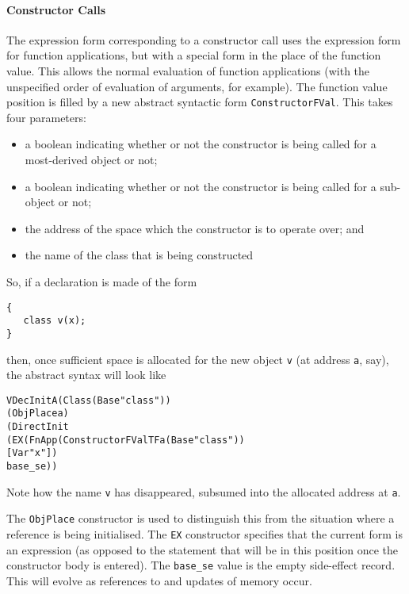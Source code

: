 \documentclass[11pt]{article}
\begin{document}
\paragraph{Constructor Calls}
The expression form corresponding to a constructor call uses the
expression form for function applications, but with a special form in
the place of the function value.  This allows the normal evaluation of
function applications (with the unspecified order of evaluation of
arguments, for example).  The function value position is filled by a
new abstract syntactic form
\texttt{ConstructorFVal}.
This takes four parameters:
\begin{itemize}
\item a boolean indicating whether or not the constructor is being
  called for a most-derived object or not;
\item a boolean indicating whether or not the constructor is being
  called for a sub-object or not;
\item the address of the space which the constructor is to operate
  over; and
\item the name of the class that is being constructed
\end{itemize}
So, if a declaration is made of the form
\begin{verbatim}
{
   class v(x);
}
\end{verbatim}
then, once sufficient space is allocated for the new object \texttt{v}
(at address \texttt{a}, say), the abstract syntax will look like
\begin{alltt}
   VDecInitA (Class (Base "class"))
             (ObjPlace a)
             (DirectInit
                (EX (FnApp (ConstructorFVal T F a (Base "class"))
                           [Var "x"])
                    base_se))
\end{alltt}
Note how the name \texttt{v} has disappeared, subsumed into the
allocated address at \texttt{a}.

The \texttt{ObjPlace} constructor is used to distinguish this from the
situation where a reference is being initialised.  The \texttt{EX}
constructor specifies that the current form is an expression (as
opposed to the statement that will be in this position once the
constructor body is entered).  The \texttt{base_se} value is the empty
side-effect record.  This will evolve as references to and updates of
memory occur.
\end{document}
